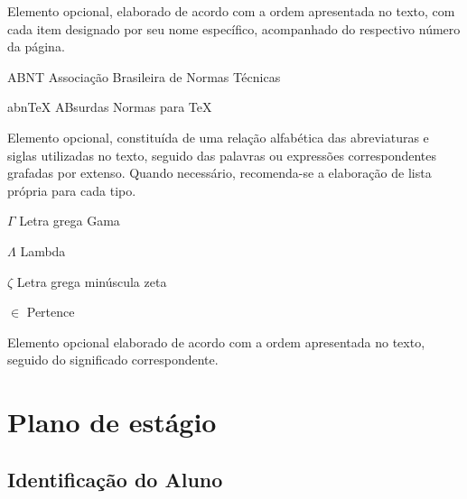 \documentclass[
	12pt,				%
	openright,			%
	oneside,			%
	a4paper,			%
	english,			%
	french,				%
	spanish,			%
	brazil				%
	]{abntex2}
\begin{document}
\listoftables*
Elemento opcional, elaborado de acordo com a ordem apresentada no texto, com
cada item designado por seu nome específico, acompanhado do respectivo número da
página.
\cleardoublepage

\begin{siglas}
  \item[ABNT] Associação Brasileira de Normas Técnicas
  \item[abnTeX] ABsurdas Normas para TeX
    \item Elemento opcional, constituída de uma relação alfabética das abreviaturas e siglas utilizadas no texto, seguido das palavras ou expressões correspondentes grafadas por extenso. Quando necessário, recomenda-se a elaboração de lista própria para cada tipo.
\end{siglas}

\begin{simbolos}
  \item[$ \Gamma $] Letra grega Gama
  \item[$ \Lambda $] Lambda
  \item[$ \zeta $] Letra grega minúscula zeta
  \item[$ \in $] Pertence
  \item Elemento opcional elaborado de acordo com a ordem apresentada no texto, seguido
do significado correspondente.
\end{simbolos}


\textual

\chapter[Plano de estágio]{Plano de estágio}
\section{Identificação do Aluno}

\parindent=0pt
\end{document}
